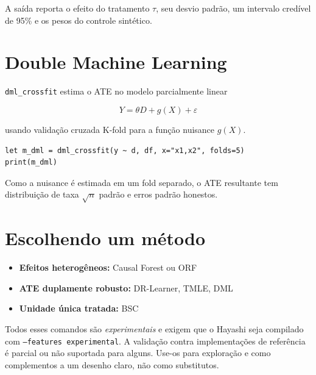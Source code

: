 A saída reporta o efeito do tratamento $\tau$, seu desvio padrão, um
intervalo credível de 95\% e os pesos do controle sintético.

\section{Double Machine Learning}

\texttt{dml\_crossfit} estima o ATE no modelo parcialmente linear

\[
Y = \theta D + g(X) + \varepsilon
\]

usando validação cruzada K-fold para a função nuisance $g(X)$.

\begin{lstlisting}[caption={Double Machine Learning}]
let m_dml = dml_crossfit(y ~ d, df, x="x1,x2", folds=5)
print(m_dml)
\end{lstlisting}

Como a nuisance é estimada em um fold separado, o ATE resultante tem
distribuição de taxa $\sqrt{n}$ padrão e erros padrão honestos.

\section{Escolhendo um método}

\begin{itemize}
\item \textbf{Efeitos heterogêneos:} Causal Forest ou ORF
\item \textbf{ATE duplamente robusto:} DR-Learner, TMLE, DML
\item \textbf{Unidade única tratada:} BSC
\end{itemize}

Todos esses comandos são \textit{experimentais} e exigem que o Hayashi
seja compilado com \texttt{--features experimental}. A validação contra
implementações de referência é parcial ou não suportada para alguns.
Use-os para exploração e como complementos a um desenho claro, não como
substitutos.
